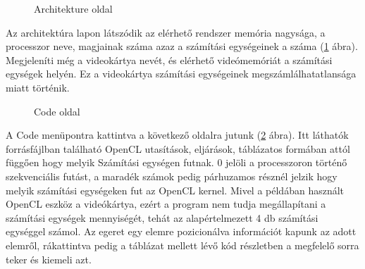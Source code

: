 \begin{figure}[h]
\centering
{}
\caption{Architekture oldal}
\label{fig:arch}
\end{figure}


Az architektúra lapon látszódik az elérhető rendszer memória nagysága, a processzor neve, magjainak száma azaz a számítási egységeinek a száma (\ref{fig:arch} ábra). Megjeleníti még a videokártya nevét, és elérhető videómemóriát a számítási egységek helyén. Ez a videokártya számítási egységeinek megszámlálhatatlansága miatt történik.

\begin{figure}[h]
\centering
{}
\caption{Code oldal}
\label{fig:code}
\end{figure}

\newpage
A Code menüpontra kattintva a következő oldalra jutunk (\ref{fig:code} ábra). Itt láthatók forrásfájlban található OpenCL utasítások, eljárások, táblázatos formában attól függően hogy melyik Számítási egységen futnak. 0 jelöli a processzoron történő szekvenciális futást, a maradék számok pedig párhuzamos résznél jelzik hogy melyik számítási egységeken fut az OpenCL kernel. Mivel a példában használt OpenCL eszköz a videókártya, ezért a program nem tudja megállapítani a számítási egységek mennyiségét, tehát az alapértelmezett 4 db számítási egységgel számol. Az egeret egy elemre pozicionálva információt kapunk az adott elemről, rákattintva pedig a táblázat mellett lévő kód részletben a megfelelő sorra teker és kiemeli azt.

